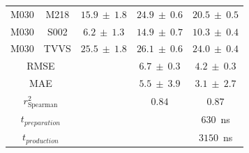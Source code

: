 \begin{table}[H]
\begin{center}
\begin{tabular}{ c c |c |c|c|}
        M030 &  M218 &   $15.9 ~\pm~ 1.8$  &  $24.9 ~\pm~ 0.6$ &  $ 20.5 ~\pm~ 0.5 $\\
        M030 &  S002 &    $6.2 ~\pm~ 1.3$  &  $14.9 ~\pm~ 0.7$ &  $ 10.3 ~\pm~ 0.4 $\\
        M030 &  TVVS &   $25.5 ~\pm~ 1.8$  &  $26.1 ~\pm~ 0.6$ &   $ 24.0 ~\pm~ 0.4 $\\
  \hline
        \multicolumn{2}{c|}{RMSE} &          & $6.7 ~\pm~ 0.3$ & $4.2 ~\pm~ 0.3 $\\
        \multicolumn{2}{c|}{MAE} &           & $5.5 ~\pm~ 3.9$ & $3.1 ~\pm~ 2.7$ \\
        \multicolumn{2}{c|}{$r^2_{\text{Spearman}}$} &  & $0.84$ & $0.87$  \\
        \multicolumn{2}{c|}{$t_{preparation}$} & & &  $630$~ns \\
        \multicolumn{2}{c|}{$t_{production}$} & & &  $3150$~ns \\
\end{tabular}
\end{center}
\label{SITab: FE_M030_Graph}
\end{table}

